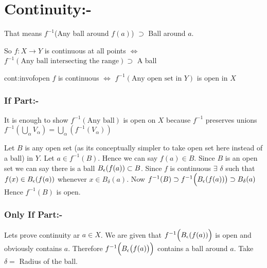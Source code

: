 \section{Continuity:-}
\setlength{\parindent}{0cm}That means $f^{-1}$(Any ball around $f(a)$) $\supset$ Ball around $a$.\setlength{\parindent}{1cm}

So $f:X\to Y$ is continuous at all points $\iff$ $f^{-1}(\text{Any ball intersecting the range})\supset $ A ball
\begin{Theorem}{}{cont:invofopen}
	$f$ is continuous $\iff$ $f^{-1}(\text{Any open set in }Y)$ is open in $X$
\end{Theorem}
\begin{myproof}
	\subsubsection*{If Part:-}
	It is enough to show $f^{-1}(\text{Any ball})$ is open on $X$ because $f^{-1}$ preserves unions $f^{-1}\left(\bigcup\limits_{\alpha}V_{\alpha}\right)=\bigcup\limits_{\alpha}\left(f^{-1}(V_{\alpha})\right)$
	
	Let $B$ is any open set (as its conceptually simpler to take open set here instead of a ball) in $Y$. Let $a\in f^{-1}(B)$. Hence we can say $f(a)\in B$. Since $B$ is an open set we can say there is a ball $B_{\epsilon}(f(a))\subset B$. Since $f$ is continuous $\exists$ $\delta $ such that $f(x)\in B_{\epsilon}(f(a))$ whenever $x\in B_{\delta}(a)$. Now $f^{-1}(B)\supset f^{-1}\Big(B_{\epsilon}(f(a))\big)\supset B_{\delta}(a)$ Hence $f^{-1} (B)$ is open. 
	
	\subsubsection*{Only If Part:-}
	Lets prove continuity ar $a\in X$. We are given that $f^{-1}\Big(B_{\epsilon}(f(a))\Big)$ is open and obviously contains $a$. Therefore $f^{-1}\Big(B_{\epsilon}\big(f(a)\big)\Big)$ contains a ball around $a$. Take $\delta=$ Radius of the ball.
\end{myproof}

